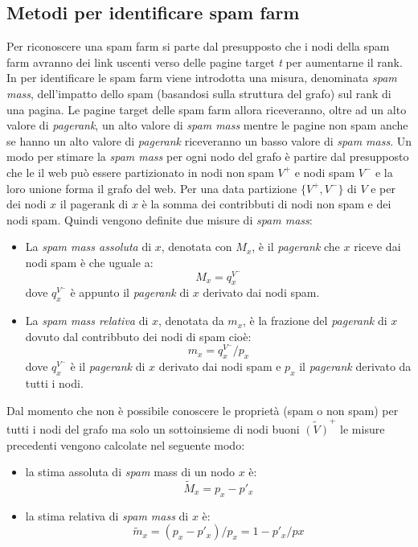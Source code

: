 \subsection{Metodi per identificare spam farm}
Per riconoscere una spam farm si parte dal presupposto che i nodi della spam farm avranno dei link uscenti verso delle pagine target \textit{t} per aumentarne il rank. In \cite{Gyongyi:2006:LSD:1182635.1164166} per identificare le spam farm viene introdotta una misura, denominata \textit{spam mass}, dell'impatto dello spam (basandosi sulla struttura del grafo) sul rank di una pagina. Le pagine target delle spam farm allora riceveranno, oltre ad un alto valore di \textit{pagerank}, un alto valore di \textit{spam mass} mentre le pagine non spam anche se hanno un alto valore di \textit{pagerank} riceveranno un basso valore di \textit{spam mass}. Un modo per stimare la \textit{spam mass} per ogni nodo del grafo è partire dal presupposto che le il web può essere partizionato in nodi non spam \(V^+\) e nodi spam \(V^-\) e la loro unione forma il grafo del web. Per una data partizione \(\{V^+,V^-\}\) di \(V\) e per dei nodi \(x\) il pagerank di \(x\) è la somma dei contribbuti di nodi non spam e dei nodi spam. 
Quindi vengono definite due misure di \textit{spam mass}:
\begin{itemize}
 \item La \textit{spam mass assoluta} di \(x\), denotata con \(M_x\), è il \textit{pagerank} che \(x\) riceve dai nodi spam è che uguale a:
 \begin{equation}
   M_x=q_x^{V^-}
 \end{equation}
dove \(q_x^{V^-}\) è appunto il \textit{pagerank} di \(x\) derivato dai nodi spam.
 \item La \textit{spam mass relativa} di \(x\), denotata da \(m_x\), è la frazione del \textit{pagerank} di \(x\) dovuto dal contribbuto dei nodi di spam cioè: 
 \begin{equation}
   m_x=q_x^{V^-}/p_x
 \end{equation}
dove \(q_x^{V^-}\) è il \textit{pagerank} di \(x\) derivato dai nodi spam e \(p_x\) il \textit{pagerank} derivato da tutti i nodi.
\end{itemize}
Dal momento che non è possibile conoscere le proprietà (spam o non spam) per tutti i nodi del grafo ma solo un sottoinsieme di nodi buoni \(\tilde{(V)}^+\) le misure precedenti vengono calcolate nel seguente modo:
\begin{itemize}
 \item la stima assoluta di \textit{spam} mass di un nodo \(x\) è:
 \begin{equation}
 \tilde{M}_x=p_x-p'_x
\end{equation}
\item la stima relativa di \textit{spam mass} di \(x\) è:
 \begin{equation}
 \tilde{m}_x=(p_x-p'_x)/p_x=1-p'_x/px
\end{equation}
\end{itemize}
